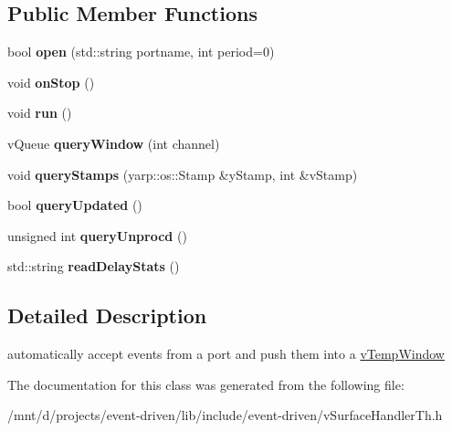 \subsection*{Public Member Functions}
\begin{DoxyCompactItemize}
\item 
\mbox{\label{classev_1_1tWinThread_a1edd593d8901ca970a51bfeb09181234}} 
bool {\bfseries open} (std\+::string portname, int period=0)
\item 
\mbox{\label{classev_1_1tWinThread_ab12b04cd804ac7f6d2f6a199bb2078a8}} 
void {\bfseries on\+Stop} ()
\item 
\mbox{\label{classev_1_1tWinThread_a6992dcf7884d08d7296e4489ef264959}} 
void {\bfseries run} ()
\item 
\mbox{\label{classev_1_1tWinThread_a6937e3d587982b4ecbc8e776c89b5ea1}} 
v\+Queue {\bfseries query\+Window} (int channel)
\item 
\mbox{\label{classev_1_1tWinThread_a346e943bc1a1e06210deb6da26fa18f6}} 
void {\bfseries query\+Stamps} (yarp\+::os\+::\+Stamp \&y\+Stamp, int \&v\+Stamp)
\item 
\mbox{\label{classev_1_1tWinThread_a4121006bf6750fb8b5d2e2844479b39f}} 
bool {\bfseries query\+Updated} ()
\item 
\mbox{\label{classev_1_1tWinThread_ab3f171e6997f7e7e68abf536afa97c17}} 
unsigned int {\bfseries query\+Unprocd} ()
\item 
\mbox{\label{classev_1_1tWinThread_acb5f610d1fe4e6eef43cae31c0ea0f8e}} 
std\+::string {\bfseries read\+Delay\+Stats} ()
\end{DoxyCompactItemize}


\subsection{Detailed Description}
automatically accept events from a port and push them into a \hyperlink{classev_1_1vTempWindow}{v\+Temp\+Window} 

The documentation for this class was generated from the following file\+:\begin{DoxyCompactItemize}
\item 
/mnt/d/projects/event-\/driven/lib/include/event-\/driven/v\+Surface\+Handler\+Th.\+h\end{DoxyCompactItemize}
